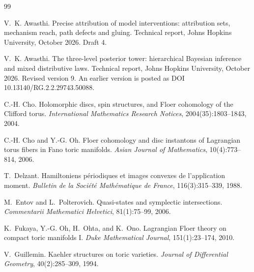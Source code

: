 \documentclass[11pt]{article}
\theoremstyle{definition}
\theoremstyle{remark}
\begin{document}
\begin{thebibliography}{99}

V.~K. Awasthi.
\newblock Precise attribution of model interventions: attribution sets, mechanism reach, path defects
and gluing.
\newblock Technical report, Johns Hopkins University, October 2026. Draft 4.

V.~K. Awasthi.
\newblock The three-level posterior tower: hierarchical {B}ayesian inference and mixed distributive laws.
\newblock Technical report, Johns Hopkins University, October 2026. Revised version 9. An earlier
version is posted as DOI 10.13140/RG.2.2.29743.50088.

C.-H. Cho.
\newblock Holomorphic discs, spin structures, and {F}loer cohomology of the {C}lifford torus.
\newblock \emph{International Mathematics Research Notices}, 2004(35):1803--1843, 2004.

C.-H. Cho and Y.-G. Oh.
\newblock Floer cohomology and disc instantons of {L}agrangian torus fibers in {F}ano toric manifolds.
\newblock \emph{Asian Journal of Mathematics}, 10(4):773--814, 2006.

T.~Delzant.
\newblock Hamiltoniens p\'eriodiques et images convexes de l'application moment.
\newblock \emph{Bulletin de la Soci\'et\'e Math\'ematique de France}, 116(3):315--339, 1988.

M.~Entov and L.~Polterovich.
\newblock Quasi-states and symplectic intersections.
\newblock \emph{Commentarii Mathematici Helvetici}, 81(1):75--99, 2006.

K.~Fukaya, Y.-G. Oh, H.~Ohta, and K.~Ono.
\newblock Lagrangian {F}loer theory on compact toric manifolds {I}.
\newblock \emph{Duke Mathematical Journal}, 151(1):23--174, 2010.

V.~Guillemin.
\newblock Kaehler structures on toric varieties.
\newblock \emph{Journal of Differential Geometry}, 40(2):285--309, 1994.

\end{thebibliography}
\end{document}
